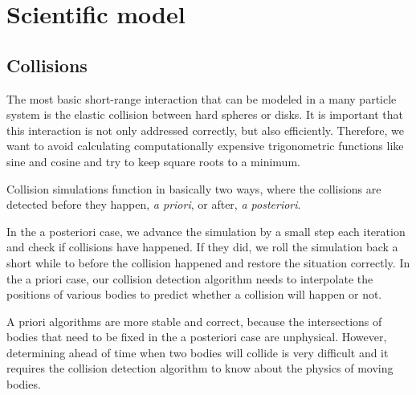 \section{Scientific model}
\subsection{Collisions}

The most basic short-range interaction that can be modeled in a many particle 
system is the elastic collision between hard spheres or disks. It is important 
that this interaction is not only addressed correctly, but also efficiently.  
Therefore, we want to avoid calculating computationally expensive trigonometric 
functions like sine and cosine and try to keep square roots to a minimum.

Collision simulations function in basically two ways, where the collisions are 
detected before they happen, \emph{a priori}, or after, \emph{a posteriori}.  

In the a posteriori case, we advance the simulation by a small step each 
iteration and check if collisions have happened. If they did, we roll the 
simulation back a short while to before the collision happened and restore the 
situation correctly. In the a priori case, our collision detection algorithm 
needs to interpolate the positions of various bodies to predict whether a 
collision will happen or not.

A priori algorithms are more stable and correct, because the intersections of 
bodies that need to be fixed in the a posteriori case are unphysical. However, 
determining ahead of time when two bodies will collide is very difficult and it 
requires the collision detection algorithm to know about the physics of moving 
bodies.

